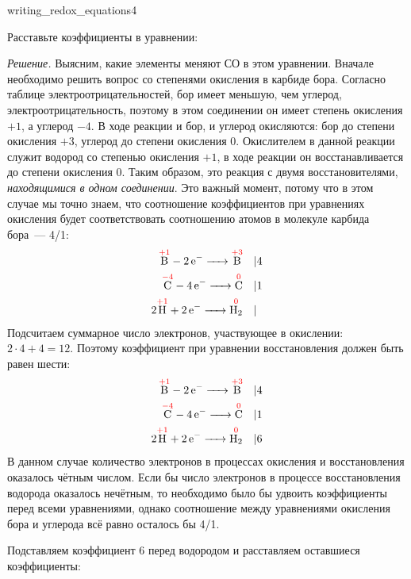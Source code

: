 \begin{example}{}{writing_redox_equations4}
    \begin{condition}
        Расставьте коэффициенты в уравнении:
    \end{condition}

    \medskip

    \textit{Решение.} Выясним, какие элементы меняют СО в этом уравнении. Вначале необходимо решить вопрос со степенями окисления в карбиде бора. Согласно таблице электроотрицательностей, бор имеет меньшую, чем углерод, электроотрицательность, поэтому в этом соединении он имеет степень окисления $+1$, а углерод $-4$. В ходе реакции и бор, и углерод окисляются: бор до степени окисления $+3$, углерод до степени окисления 0. Окислителем в данной реакции служит водород со степенью окисления $+1$, в ходе реакции он восстанавливается до степени окисления 0. Таким образом, это реакция с двумя восстановителями, \emph{находящимися в одном соединении}. Это важный момент, потому что в этом случае мы точно знаем, что соотношение коэффициентов при уравнениях окисления будет соответствовать соотношению атомов в молекуле карбида бора~--- 4/1:
    \begin{align*}
        \overset{\textcolor{red}{+1}}{\ce{B}} - \ce{2e- ->} \overset{\textcolor{red}{+3}}{\ce{B}} \quad &| 4 \\
        \overset{\textcolor{red}{-4}}{\ce{C}} - \ce{4e- ->} \overset{\textcolor{red}{0}}{\ce{C}} \quad &| 1 \\
        2\overset{\textcolor{red}{+1}}{\ce{H}} + \ce{2e- ->} \overset{\textcolor{red}{0}}{\ce{H2}} \quad &|
    \end{align*}
    Подсчитаем суммарное число электронов, участвующее в окислении: $2 \cdot 4 + 4 = 12$. Поэтому коэффициент при уравнении восстановления должен быть равен шести:
    \begin{align*}
        \overset{\textcolor{red}{+1}}{\ce{B}} - \ce{2e- ->} \overset{\textcolor{red}{+3}}{\ce{B}} \quad &| 4 \\
        \overset{\textcolor{red}{-4}}{\ce{C}} - \ce{4e- ->} \overset{\textcolor{red}{0}}{\ce{C}} \quad &| 1 \\
        2\overset{\textcolor{red}{+1}}{\ce{H}} + \ce{2e- ->} \overset{\textcolor{red}{0}}{\ce{H2}} \quad &| 6
    \end{align*}
    В данном случае количество электронов в процессах окисления и восстановления оказалось чётным числом. Если бы число электронов в процессе восстановления водорода оказалось нечётным, то необходимо было бы удвоить коэффициенты перед всеми уравнениями, однако соотношение между уравнениями окисления бора и углерода всё равно осталось бы 4/1.

    Подставляем коэффициент 6 перед водородом и расставляем оставшиеся коэффициенты:
\end{example}

